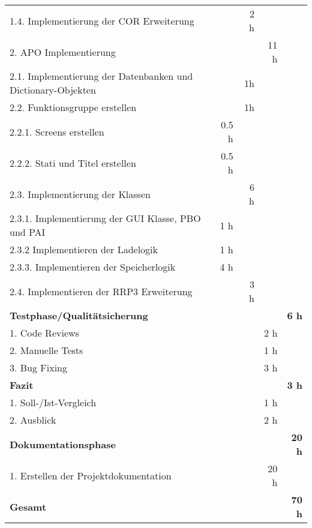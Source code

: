 \begin{tabu}{lrrrr}
1.4. Implementierung der COR Erweiterung & & 2 h & & \\
2. APO Implementierung & & & 11 h & \\
2.1. Implementierung der Datenbanken und Dictionary-Objekten & & 1h & & \\
2.2. Funktionsgruppe erstellen & & 1h & & \\
2.2.1. Screens erstellen & 0.5 h & & & \\
2.2.2. Stati und Titel erstellen & 0.5 h & & & \\
2.3. Implementierung der Klassen & & 6 h & & \\
2.3.1. Implementierung der GUI Klasse, PBO und PAI & 1 h & & & \\
2.3.2 Implementieren der Ladelogik & 1 h & & & \\
2.3.3. Implementieren der Speicherlogik & 4 h & & & \\
2.4. Implementieren der RRP3 Erweiterung & & 3 h & & \\
\rowfont{\color{headingfont}}\textbf{Testphase/Qualitätsicherung} & \textbf{} & \textbf{} & \textbf{} & \textbf{6 h} \\
1. Code Reviews & & & 2 h   &  \\
 2. Manuelle Tests & & & 1 h & \\
3. Bug Fixing & & & 3 h & \\
\rowfont{\color{headingfont}}\textbf{Fazit} & \textbf{} & \textbf{} & \textbf{} & \textbf{3 h} \\
1. Soll-/Ist-Vergleich & & & 1 h   &  \\
2. Ausblick & & & 2 h & \\
\rowfont{\color{headingfont}}\textbf{Dokumentationsphase} & \textbf{} & \textbf{} & \textbf{} & \textbf{20 h} \\1. Erstellen der Projektdokumentation & & & 20 h & \\
\hline
\hline
{}\textbf{Gesamt} & \textbf{} & \textbf{} & \textbf{} & \textbf{70 h} \\
\end{tabu}
